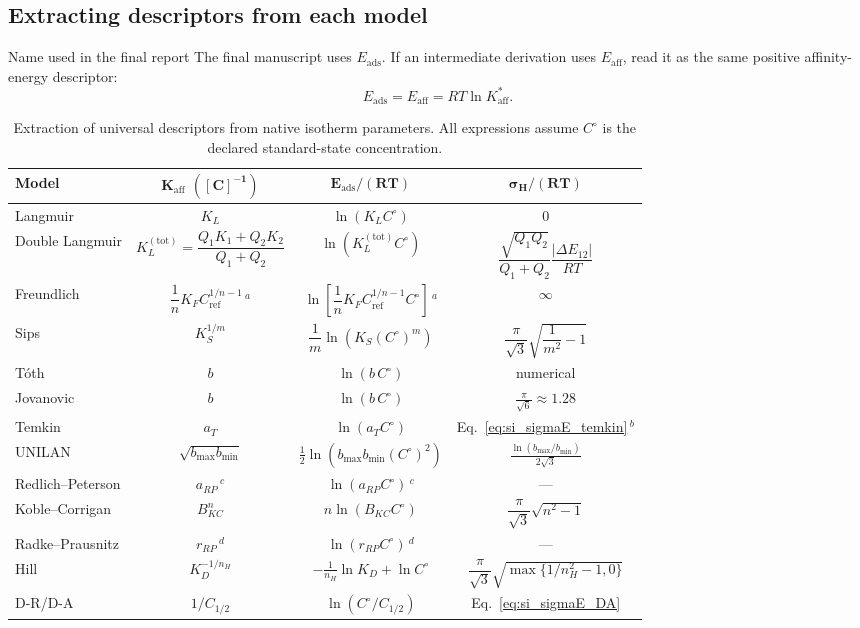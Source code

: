 \documentclass[journal=jacsat,manuscript=article]{achemso}
\begin{document}
\subsection{Extracting descriptors from each model}
\label{sec:si_extraction}

\begin{greenbox}{Name used in the final report}
	The final manuscript uses \(E_{\mathrm{ads}}\). If an intermediate
	derivation uses \(E_{\mathrm{aff}}\), read it as the same positive
	affinity-energy descriptor:
	\[
		E_{\mathrm{ads}}=E_{\mathrm{aff}}
		=RT\ln K_{\mathrm{aff}}^{\ast}.
	\]
\end{greenbox}

\begin{table}[H]
	\centering
	\small
	\caption{Extraction of universal descriptors from native isotherm
		parameters.  All expressions assume $C^\circ$ is the declared
		standard-state concentration.}
	\label{tab:si_extraction}
	\renewcommand{\arraystretch}{1.5}
	\begin{tabular}{@{} l c c c @{}}
		\toprule
		\textbf{Model}
		& $\boldsymbol{K_{\mathrm{aff}}}$ $\boldsymbol{([C]^{-1})}$
		& $\boldsymbol{E_{\mathrm{ads}}/(RT)}$
		& $\boldsymbol{\sigma_H/(RT)}$ \\
		\midrule
		Langmuir
		& $K_L$
		& $\ln(K_L C^\circ)$
		& $0$ \\
		Double Langmuir
		& $K_L^{\mathrm{(tot)}} = \dfrac{Q_1K_1 + Q_2K_2}{Q_1+Q_2}$
		& $\ln(K_L^{\mathrm{(tot)}} C^\circ)$
		& $\dfrac{\sqrt{Q_1Q_2}}{Q_1+Q_2}\dfrac{|\Delta E_{12}|}{RT}$ \\
		Freundlich
		& $\dfrac{1}{n}K_F C_{\mathrm{ref}}^{1/n-1}$\,$^{a}$
		& $\ln\!\left[\dfrac{1}{n}K_F C_{\mathrm{ref}}^{1/n-1} C^\circ\right]$\,$^{a}$
		& $\infty$ \\
		Sips
		& $K_S^{1/m}$
		& $\dfrac{1}{m}\ln(K_S (C^\circ)^m)$
		& $\dfrac{\pi}{\sqrt{3}}\sqrt{\dfrac{1}{m^2}-1}$ \\
		T\'{o}th
		& $b$
		& $\ln(b\,C^\circ)$
		& numerical \\
		Jovanovic
		& $b$
		& $\ln(b\,C^\circ)$
		& $\frac{\pi}{\sqrt{6}} \approx 1.28$ \\
		Temkin
		& $a_T$
		& $\ln(a_T C^\circ)$
		& Eq.~\ref{eq:si_sigmaE_temkin}\,$^{b}$ \\
		UNILAN
		& $\sqrt{b_{\max}b_{\min}}$
		& $\frac{1}{2}\ln(b_{\max}b_{\min}(C^\circ)^2)$
		& $\frac{\ln(b_{\max}/b_{\min})}{2\sqrt{3}}$ \\
		Redlich--Peterson
		& $a_{RP}$\,$^{c}$
		& $\ln(a_{RP} C^\circ)$\,$^{c}$
		& --- \\
		Koble--Corrigan
		& $B_{KC}^{n}$
		& $n\ln(B_{KC} C^\circ)$
		& $\dfrac{\pi}{\sqrt{3}}\sqrt{n^2-1}$ \\
		Radke--Prausnitz
		& $r_{RP}$\,$^{d}$
		& $\ln(r_{RP} C^\circ)$\,$^{d}$
		& --- \\
		Hill
		& $K_D^{-1/n_H}$
		& $-\frac{1}{n_H}\ln K_D + \ln C^\circ$
		& $\dfrac{\pi}{\sqrt{3}}\sqrt{\max\{1/n_H^2-1,0\}}$ \\
		D-R/D-A
		& $1/C_{1/2}$
		& $\ln(C^\circ/C_{1/2})$
		& Eq.~\ref{eq:si_sigmaE_DA} \\
		\bottomrule
	\end{tabular}


\end{table}
\end{document}
